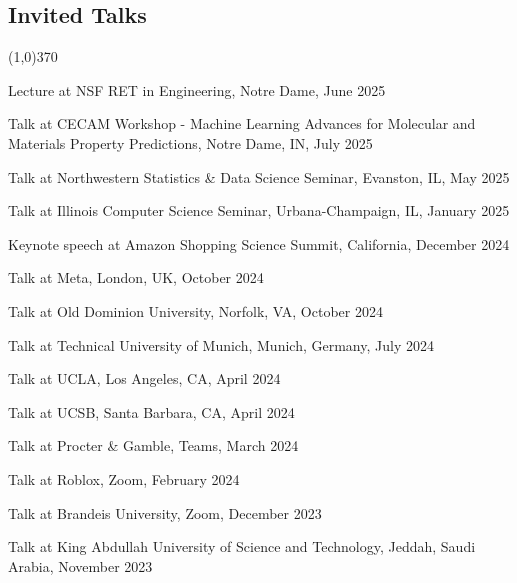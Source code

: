 \documentclass[10pt]{article}
\newenvironment{myindentpar}[1]%
{\begin{list}{}%
         {\setlength{\leftmargin}{#1}}%
         \item[]%
}
{\end{list}}
\newcounter{list}
\begin{document}
\subsection{\sc Invited Talks}
\vspace{-0.4cm} \line(1,0){370} \vspace{-0.1cm}

\begin{myindentpar}{0.75cm}
	
\hspace{-0.75cm} Lecture at NSF RET in Engineering, Notre Dame, June 2025
	
\hspace{-0.75cm} Talk at CECAM Workshop - Machine Learning Advances for Molecular and Materials Property Predictions, Notre Dame, IN, July 2025

\hspace{-0.75cm} Talk at Northwestern Statistics \& Data Science Seminar, Evanston, IL, May 2025
	
\hspace{-0.75cm} Talk at Illinois Computer Science Seminar, Urbana-Champaign, IL, January 2025

\hspace{-0.75cm} Keynote speech at Amazon Shopping Science Summit, California, December 2024	

\hspace{-0.75cm} Talk at Meta, London, UK, October 2024
	
\hspace{-0.75cm} Talk at Old Dominion University, Norfolk, VA, October 2024
	
\hspace{-0.75cm} Talk at Technical University of Munich, Munich, Germany, July 2024
	
\hspace{-0.75cm} Talk at UCLA, Los Angeles, CA, April 2024
	
\hspace{-0.75cm} Talk at UCSB, Santa Barbara, CA, April 2024

\hspace{-0.75cm} Talk at Procter \& Gamble, Teams, March 2024
	
\hspace{-0.75cm} Talk at Roblox, Zoom, February 2024
	
\hspace{-0.75cm} Talk at Brandeis University, Zoom, December 2023	

\hspace{-0.75cm} Talk at King Abdullah University of Science and Technology, Jeddah, Saudi Arabia, November 2023	


\end{myindentpar}
\end{document}
